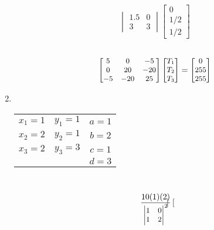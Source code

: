\documentclass[10pt]{article}
\begin{document}
\begin{enumerate}
\begin{align*}
{\begin{vmatrix} 1.5 & 0 \\ 
3 & 3 \end{vmatrix} 
\begin{bmatrix} 
0 \\ 1/2 \\ 1/2
\end{bmatrix}}
\end{align*}\\
\begin{align*}
\small{
\begin{bmatrix}
5 & 0 & -5\\
0 & 20 & -20 \\
-5 & -20 & 25
\end{bmatrix}
\begin{bmatrix} 
T_1 \\ T_2 \\ T_3
\end{bmatrix} =  
\begin{bmatrix} 
0 \\ 255 \\ 255
\end{bmatrix}}
\end{align*}
\newpage
\item\mbox{}\\
\begin{minipage}{0.5\textwidth}
\end{minipage}
\begin{minipage}{0.5\textwidth}
\begin{tabular}{ccc}
$x_1 = 1$ & $y_1 = 1$ & $a = 1 $\\
$x_2 = 2 $& $y_2 = 1$ & $b = 2 $\\
$x_3 = 2$ & $y_3 = 3$ & $c = 1 $ \\
 & & $d = 3$
\end{tabular}
\end{minipage} \\
\begin{align*}
\small{
\frac{10(1)(2)}
{\begin{vmatrix}
1 & 0 \\
1 & 2
\end{vmatrix}^2} 
\begin{bmatrix}

\end{bmatrix}}
\end{align*}
\end{enumerate}
\end{document}
